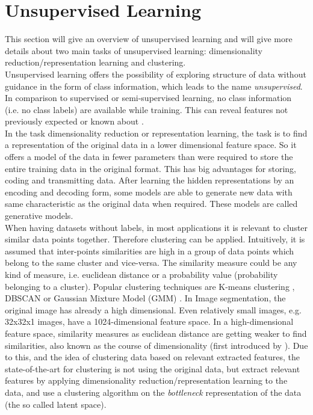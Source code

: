 \documentclass[12pt,DIV14,BCOR12mm,a4paper,footexclude,headinclude,halfparskip-,twoside,openright,cleardoubleempty,idxtotoc,bibtotoc,listtotoc,abstracton]{scrreprt} %
\numberwithin{equation}{chapter}
\begin{document}
\section{Unsupervised Learning}
This section will give an overview of unsupervised learning and will give more details about two main tasks of unsupervised learning: dimensionality reduction/representation learning and clustering.\\
Unsupervised learning offers the possibility of exploring structure of data without guidance in the form of class information, which leads to the name \textit{unsupervised}. In comparison to supervised or semi-supervised learning, no class information (i.e. no class labels) are available while training. This can  reveal features not previously expected or known about \cite{Michie-et-al-1994}.\\
In the task dimensionality reduction or representation learning, the task is to find a representation of the original data in a lower dimensional feature space. So it offers a model of the data in fewer parameters than were required to store the entire training data in the original format. This has big advantages for storing, coding and transmitting data. After learning the hidden representations by an encoding and decoding form, some models are able to generate new data with same characteristic as the original data when required. These models are called generative models.\\
When having datasets without labels, in most applications it is relevant to cluster similar data points together. Therefore clustering can be applied. Intuitively, it is assumed that inter-points similarities are high in a group of data points which belong to the same cluster and vice-versa. The similarity measure could be any kind of measure, i.e. euclidean distance or a probability value (probability belonging to a cluster). Popular clustering techniques are K-means clustering \cite{Lloyd82leastsquares}, DBSCAN \cite{Ester96adensity-based} or Gaussian Mixture Model (GMM) \cite{Gilles07MixtureModelsforClassification}. In Image segmentation, the original image has already a high dimensional. Even relatively small images, e.g. 32x32x1 images, have a 1024-dimensional feature space. In a high-dimensional feature space, similarity measures as euclidean distance are getting weaker to find similarities, also known as the course of dimensionality (first introduced by \cite{Bellman34}). Due to this, and the idea of clustering data based on relevant extracted features, the state-of-the-art for clustering is not using the original data, but extract relevant features by applying dimensionality reduction/representation learning to the data, and use a clustering algorithm on the \textit{bottleneck} representation of the data (the so called latent space).
\end{document}
